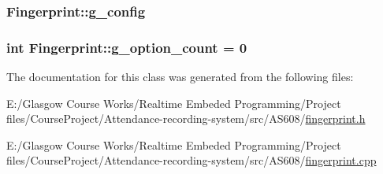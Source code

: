 \subsubsection[{g\+\_\+config}]{ Fingerprint\+::g\+\_\+config\hspace{0.3cm}{\ttfamily [private]}}\label{class_fingerprint_a024d7d3de7d047b02358fac4625d0c6c}
\hypertarget{class_fingerprint_aa15d4217dbabc0f81f1cf974e9d0210e}{}
\subsubsection[{g\+\_\+option\+\_\+count}]{\setlength{\rightskip}{0pt plus 5cm}int Fingerprint\+::g\+\_\+option\+\_\+count = 0\hspace{0.3cm}{\ttfamily [private]}}\label{class_fingerprint_aa15d4217dbabc0f81f1cf974e9d0210e}


The documentation for this class was generated from the following files\+:\begin{DoxyCompactItemize}
\item 
E\+:/\+Glasgow Course Works/\+Realtime Embeded Programming/\+Project files/\+Course\+Project/\+Attendance-\/recording-\/system/src/\+A\+S608/\hyperlink{fingerprint_8h}{fingerprint.\+h}\item 
E\+:/\+Glasgow Course Works/\+Realtime Embeded Programming/\+Project files/\+Course\+Project/\+Attendance-\/recording-\/system/src/\+A\+S608/\hyperlink{fingerprint_8cpp}{fingerprint.\+cpp}\end{DoxyCompactItemize}

